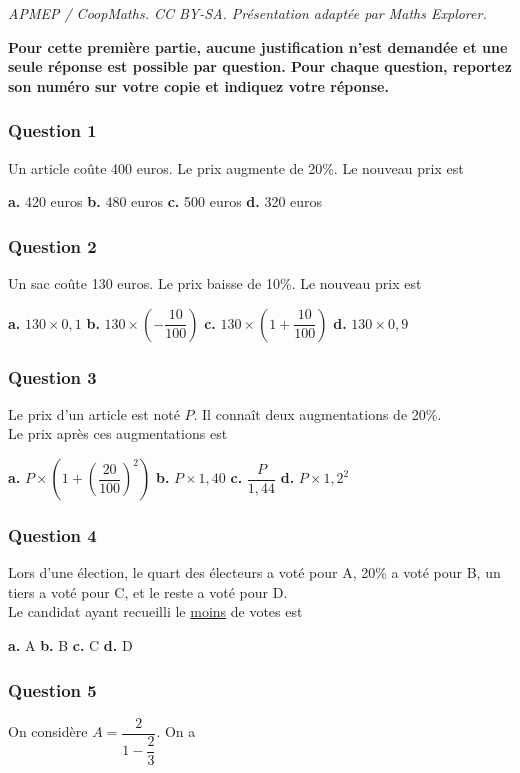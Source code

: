 \documentclass[10pt]{article}
\begin{document}
\noindent\textit{APMEP / CoopMaths. CC BY-SA. Présentation adaptée par Maths Explorer.}\par\medskip
\textbf{Pour cette première partie, aucune justification n'est demandée et une seule réponse est possible par question. Pour chaque question, reportez son numéro sur votre copie et indiquez votre réponse.}

\subsubsection*{Question 1}
Un article coûte 400 euros. Le prix augmente de 20\%. Le nouveau prix est

\textbf{a.} 420 euros \hfill \textbf{b.} 480 euros \hfill \textbf{c.} 500 euros \hfill \textbf{d.} 320 euros

\subsubsection*{Question 2}
Un sac coûte 130 euros. Le prix baisse de 10\%. Le nouveau prix est

\textbf{a.} $130 \times 0,1$ \hfill \textbf{b.} $130 \times \left(-\dfrac{10}{100}\right)$ \hfill \textbf{c.} $130 \times \left(1 + \dfrac{10}{100}\right)$ \hfill \textbf{d.} $130 \times 0,9$

\subsubsection*{Question 3}
Le prix d'un article est noté $P$. Il connaît deux augmentations de 20\%. \\
Le prix après ces augmentations est

\textbf{a.} $P \times \left(1 + \left(\dfrac{20}{100}\right)^2\right)$ \hfill \textbf{b.} $P \times 1,40$ \hfill \textbf{c.} $\dfrac{P}{1,44}$ \hfill \textbf{d.} $P \times 1,2^2$

\subsubsection*{Question 4}
Lors d'une élection, le quart des électeurs a voté pour A, 20\% a voté pour B, un tiers a voté pour C, et le reste a voté pour D. \\
Le candidat ayant recueilli le \underline{moins} de votes est

\textbf{a.} A \hfill \textbf{b.} B \hfill \textbf{c.} C \hfill \textbf{d.} D

\subsubsection*{Question 5}
On considère $A = \dfrac{2}{1 - \dfrac{2}{3}}$. On a
\end{document}
